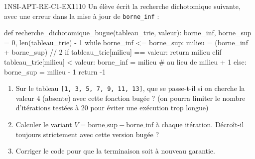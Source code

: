 

\begin{exercice}{1NSI-APT-RE-C1-EX1}{1}{10}
Un élève écrit la recherche dichotomique suivante, avec une erreur dans la mise à jour de
\lstinline{borne_inf} :
\begin{python}
def recherche_dichotomique_bugue(tableau_trie, valeur):
    borne_inf, borne_sup = 0, len(tableau_trie) - 1
    while borne_inf <= borne_sup:
        milieu = (borne_inf + borne_sup) // 2
        if tableau_trie[milieu] == valeur:
            return milieu
        elif tableau_trie[milieu] < valeur:
            borne_inf = milieu  # au lieu de milieu + 1
        else:
            borne_sup = milieu - 1
    return -1
\end{python}
\begin{enumerate}
  \item Sur le tableau \lstinline{[1, 3, 5, 7, 9, 11, 13]}, que se passe-t-il si on cherche la valeur $4$ (absente) avec cette fonction bugée ? (on pourra limiter le nombre d'itérations testées à $20$ pour éviter une exécution trop longue)
  \item Calculer le variant $V=\text{borne\_sup}-\text{borne\_inf}$ à chaque itération. Décroît-il toujours strictement avec cette version bugée ?
  \item Corriger le code pour que la terminaison soit à nouveau garantie.
\end{enumerate}
\end{exercice}

